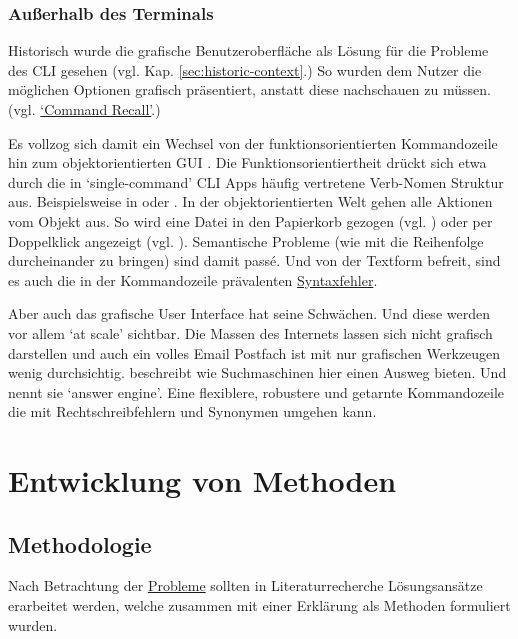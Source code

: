 \documentclass[oneside,bibliography=totocnumbered,BCOR=5mm]{scrbook}
\begin{document}
\subsection{Außerhalb des Terminals}
\label{sec:weiterentwicklung-ausser}

Historisch wurde die grafische Benutzeroberfläche als Lösung für die Probleme
des CLI gesehen (vgl. Kap. \ref{sec:historic-context}.) So wurden dem Nutzer die
möglichen Optionen grafisch präsentiert, anstatt diese nachschauen zu müssen.
(vgl. \hyperref[prob:cr]{`Command Recall'}.)

Es vollzog sich damit ein Wechsel von der funktionsorientierten
Kommandozeile hin zum objektorientierten GUI \parencite{nielson1993}. Die
Funktionsorientiertheit drückt sich etwa durch die in `single-command' CLI Apps
häufig vertretene Verb-Nomen Struktur aus. Beispielsweise in  oder . In der objektorientierten Welt gehen alle
Aktionen vom Objekt aus. So wird eine Datei in den Papierkorb gezogen (vgl.
) oder per Doppelklick angezeigt (vgl. ). Semantische Probleme (wie mit  die Reihenfolge
durcheinander zu bringen) sind damit passé. Und von der Textform befreit, sind
es auch die in der Kommandozeile prävalenten \hyperref[prob:ss]{Syntaxfehler}.

Aber auch das grafische User Interface hat seine Schwächen. Und diese werden vor
allem `at scale' sichtbar. Die Massen des Internets lassen sich nicht grafisch
darstellen und auch ein volles Email Postfach ist mit nur grafischen Werkzeugen
wenig durchsichtig. \textcite{Norman_2007} beschreibt wie Suchmaschinen hier einen
Ausweg bieten. Und nennt sie `answer engine'. Eine flexiblere, robustere und
getarnte Kommandozeile die mit Rechtschreibfehlern und Synonymen umgehen kann.

\chapter{Entwicklung von Methoden}
\label{sec:methods}

\section{Methodologie}

Nach Betrachtung der \hyperref[sec:cli-problems]{Probleme} sollten in
Literaturrecherche Lösungsansätze erarbeitet werden, welche zusammen mit einer
Erklärung als Methoden formuliert wurden.
\end{document}
